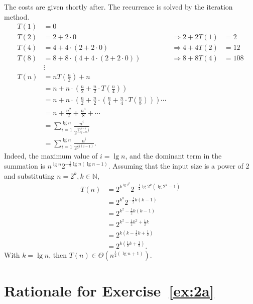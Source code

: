 \documentclass[12pt]{article}
\begin{document}
\begin{enumerate}
\begin{enumerate}
    The costs are given shortly after. The recurrence is solved by the iteration method. 
    \begin{align*}
      T(1) &= 0 \\
      T(2) &= 2 + 2 \cdot 0 &\Rightarrow 2 + 2T(1) &= 2 \\
      T(4) &= 4 + 4 \cdot (2 + 2 \cdot 0) &\Rightarrow 4 + 4T(2) &= 12 \\
      T(8) &= 8 + 8 \cdot (4 + 4 \cdot (2 + 2 \cdot 0)) &\Rightarrow 8 + 8T(4) &= 108 \\
      &\vdots \\
      T(n) &= nT(\tfrac{n}{2}) + n \\
      &= n + n \cdot (\tfrac{n}{2} + \tfrac{n}{2} \cdot T(\tfrac{n}{4})) \\
      &= n + n \cdot (\tfrac{n}{2} + \tfrac{n}{2} \cdot (\tfrac{n}{4} + \tfrac{n}{4} \cdot T(\tfrac{n}{8}))) \cdots \\
      &= n + \tfrac{n^{2}}{2} + \tfrac{n^{3}}{8} + \cdots \\
      &= \sum_{i = 1}^{\lg n} \frac{n^{i}}{2^{\sum_{j = 0}^{i - 1} j}} \\
      &= \sum_{i = 1}^{\lg n} \frac{n^{i}}{2^{\frac{1}{2}i (i - 1)}}.
    \end{align*}
    Indeed, the maximum value of $i = \lg n$, and the dominant term in the summation is $n^{\lg n} 2^{-\frac{1}{2}\lg n(\lg n - 1)}$. Assuming that the input size is a power of 2 and substituting $n = 2^{k}, k \in \mathbb{N}$,
    \begin{align*}
      T(n) &= 2^{k^{\lg 2^{k}}}2^{-\frac{1}{2}\lg 2^{k}(\lg 2^{k} - 1)} \\
      &= 2^{k^{k}}2^{-\frac{1}{2}k(k - 1)} \\
      &= 2^{k^{2} - \frac{1}{2}k(k - 1)} \\
      &= 2^{k^{2} - \frac{1}{2}k^{2} + \frac{1}{2}k} \\
      &= 2^{k(k - \frac{1}{2}k + \frac{1}{2})} \\
      &= 2^{k(\frac{1}{2}k + \frac{1}{2})}.
    \end{align*}
    With $k = \lg n$, then $T(n) \in \Theta(n^{\frac{1}{2}(\lg n + 1)})$.
  \end{enumerate}
\end{enumerate}

\appendix

\section{Rationale for Exercise~\ref{ex:2a}}\label{appendix:2a}
\end{document}
